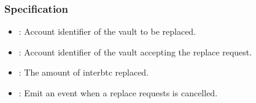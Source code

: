 \documentclass[a4paper,10pt,english]{sphinxmanual}
\begin{document}
\subsubsection{Specification}
\label{\detokenize{spec/vault-registry:id36}}


\begin{itemize}
\item {} 
: Account identifier of the vault to be replaced.

\item {} 
: Account identifier of the vault accepting the replace request.

\item {} 
: The amount of interbtc replaced.

\end{itemize}

\begin{itemize}
\item {} 
: Emit an event when a replace requests is cancelled.

\end{itemize}
\end{document}
